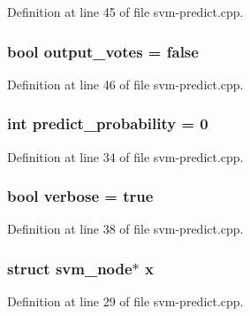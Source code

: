 Definition at line 45 of file svm-\/predict.\-cpp.

\hypertarget{svm-predict_8cpp_ac3602f56435c68a322553ed33804e5d1}{
\subsubsection[{output\-\_\-votes}]{\setlength{\rightskip}{0pt plus 5cm}bool output\-\_\-votes = false}}\label{svm-predict_8cpp_ac3602f56435c68a322553ed33804e5d1}


Definition at line 46 of file svm-\/predict.\-cpp.

\hypertarget{svm-predict_8cpp_a1501132f5226b295e5300d74da55a2b9}{
\subsubsection[{predict\-\_\-probability}]{\setlength{\rightskip}{0pt plus 5cm}int predict\-\_\-probability = 0}}\label{svm-predict_8cpp_a1501132f5226b295e5300d74da55a2b9}


Definition at line 34 of file svm-\/predict.\-cpp.

\hypertarget{svm-predict_8cpp_ab3f078684998b83967d507d0f453f454}{
\subsubsection[{verbose}]{\setlength{\rightskip}{0pt plus 5cm}bool verbose = true}}\label{svm-predict_8cpp_ab3f078684998b83967d507d0f453f454}


Definition at line 38 of file svm-\/predict.\-cpp.

\hypertarget{svm-predict_8cpp_a9a5b72a4065074cac5da07efb80a1e79}{
\subsubsection[{x}]{\setlength{\rightskip}{0pt plus 5cm}struct {\bf svm\-\_\-node}$\ast$ x}}\label{svm-predict_8cpp_a9a5b72a4065074cac5da07efb80a1e79}


Definition at line 29 of file svm-\/predict.\-cpp.

